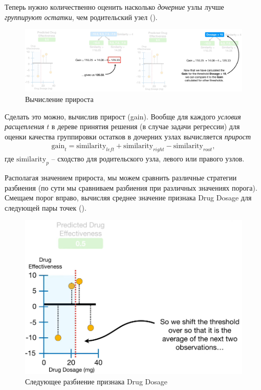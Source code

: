 \documentclass[%
	11pt,
	a4paper,
	utf8,
		]{article}
\begin{document}
Теперь нужно количественно оценить насколько \emph{дочерние} узлы лучше \emph{группируют остатки}, чем родительский узел ().

\begin{figure}[h]
	\centering
	\includegraphics[scale=0.35]{figures/xgboost_gain1.png}
	\caption{ Вычисление прироста }\label{fig:xgboost_gain1}
\end{figure}

Сделать это можно, вычислив прирост (gain). Вообще для каждого \emph{условия расщепления} $ t $ в дереве принятия решения (в случае задачи регрессии) для оценки качества группировки остатков в дочерних узлах вычисляется \emph{прирост}
\begin{align*}
	\text{gain}_t = \text{similarity}_{left} + \text{similarity}_{right} - \text{similarity}_{root},
\end{align*}
где $ \text{similarity}_p $ -- сходство для родительского узла, левого или правого узлов.

Располагая значением прироста, мы можем сравнить различные стратегии разбиения (по сути мы сравниваем разбиения при различных значениях порога). Смещаем порог вправо, вычисляя среднее значение признака Drug Dosage для следующей пары точек ().

\begin{figure}[h]
	\centering
	\includegraphics[scale=0.4]{figures/xgboost_threshold2.png}
	\caption{ Следующее разбиение признака Drug Dosage }\label{fig:xgboost_threshold2}
\end{figure}
\end{document}
